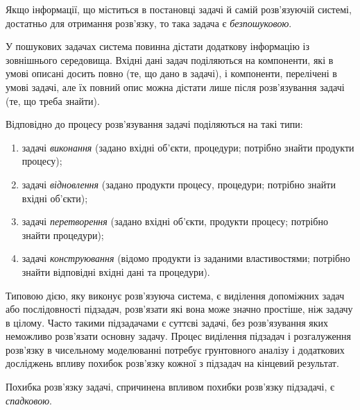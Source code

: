 \begin{definition}
    Якщо інформації, що міститься в постановці задачі й самій розв'язуючій системі, достатньо для отримання розв'язку, то така задача є \textit{безпошуковою}.
\end{definition}

У пошукових задачах система повинна дістати додаткову інформацію із зовнішнього середовища. Вхідні дані задач поділяються на компоненти, які в умові описані досить повно (те, що дано в задачі), і компоненти, перелічені в умові задачі, але їх повний опис можна дістати лише після розв'язування задачі (те, що треба знайти). \medskip

Відповідно до процесу розв'язування задачі поділяються на такі типи:
\begin{enumerate}
    \item задачі \textit{виконання} (задано вхідні об'єкти, процедури; потрібно знайти продукти процесу);
    \item задачі \textit{відновлення} (задано продукти процесу, процедури; потрібно знайти вхідні об'єкти);
    \item задачі \textit{перетворення} (задано вхідні об'єкти, продукти процесу; потрібно знайти процедури);
    \item задачі \textit{конструювання} (відомо продукти із заданими властивостями; потрібно знайти відповідні вхідні дані та процедури).
\end{enumerate}
 
\begin{remark}
    Типовою дією, яку виконує розв'язуюча система, є виділення допоміжних задач або послідовності підзадач, розв'язати які вона може значно простіше, ніж задачу в цілому. Часто такими підзадачами є суттєві задачі, без розв'язування яких неможливо розв'язати основну задачу. Процес виділення підзадач і розгалуження розв'язку в чисельному моделюванні потребує грунтовного аналізу і додаткових досліджень впливу похибок розв'язку кожної з підзадач на кінцевий результат.
\end{remark}

\begin{definition}
    Похибка розв'язку задачі, спричинена впливом похибки роз\-в'яз\-ку підзадачі, є \textit{спадковою}.
\end{definition}

